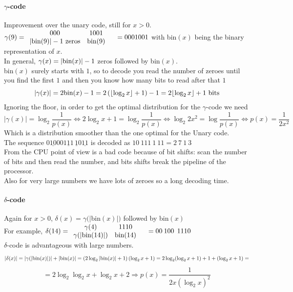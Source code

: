 \documentclass[10pt]{report}
\begin{document}
\paragraph{$\gamma$-code} Improvement over the unary code, still for $x > 0$.\\
$\gamma(9) = \begin{array}{c c c}
000 & 1001 & \\
|\hbox{bin(9)}|-1\hbox{ zeros} & \hbox{bin(9)} &
\end{array} = 0001001$ with bin$(x)$ being the binary representation of $x$.\\
In general, $\gamma(x) = |\hbox{bin}(x)| - 1$ zeros followed by bin$(x)$.\\
bin$(x)$ surely starts with $1$, so to decode you read the number of zeroes until you find the first $1$ and then you know how many bits to read after that $1$\\
$$|\gamma(x)| = 2\hbox{bin}(x) - 1 = 2\left(\lfloor\log_2 x\rfloor + 1\right) - 1 = 2\lfloor\log_2 x\rfloor + 1\hbox{ bits}$$
Ignoring the floor, in order to get the optimal distribution for the $\gamma$-code we need $$|\gamma(x)| = \log_2\frac{1}{p(x)} \Leftrightarrow 2\log_2 x + 1 = \log_2\frac{1}{p(x)} \Leftrightarrow \log_2 2x^2 = \log \frac{1}{p(x)} \Leftrightarrow p(x) = \frac{1}{2x^2}$$
Which is a distribution smoother than the one optimal for the Unary code.\\
The sequence $0\underline{10}00\underline{111}\,\underline{1}0\underline{11}$ is decoded as $10\:111\:1\:11 = 2\:7\:1\:3$\\
From the CPU point of view is a bad code because of bit shifts: scan the number of bits and then read the number, and bits shifts break the pipeline of the processor.\\
Also for very large numbers we have lots of zeroes so a long decoding time.

\paragraph{$\delta$-code} Again for $x>0$, $\delta(x) = \gamma(|$bin$(x)|)$ followed by bin$(x)$\\
For example, $\delta(14) = \begin{array}{c c c}
\gamma(4) & 1110 & \\
\gamma(|\hbox{bin(14)}|) & \hbox{bin(14)} &
\end{array} = 00\:100\:\:1110$\\
$\delta$-code is advantageous with large numbers.$$|\delta(x)| = |\gamma(|\hbox{bin}(x)|)| + |\hbox{bin}(x)| = \left(2\log_2 |\hbox{bin}(x)| + 1\right) \left(\log_2 x + 1\right) = 2\log_2(\log_2 x + 1) + 1 + (\log_2 x + 1)=$$
$$= 2\log_2\log_2 x + \log_2 x + 2 \Rightarrow p(x) = \frac{1}{2x(\log_2 x)^2}$$
\end{document}
